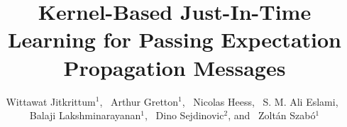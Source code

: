 \documentclass[english]{beamer}
\title{Kernel-Based Just-In-Time Learning for Passing Expectation Propagation
    Messages \vspace{5mm} }
\author{Wittawat Jitkrittum$^1$, \, Arthur Gretton$^1$, \, Nicolas Heess, \, S. M. Ali Eslami, \, 
Balaji Lakshminarayanan$^1$, \, Dino Sejdinovic$^2$, and \, Zolt{\'a}n Szab{\'o}$^1$  
\vspace*{3mm} 
}
\institute{%
Gatsby Computational Neuroscience Unit, University College London$^1$ 
\hspace{2cm}
University of Oxford$^2$
}
\begin{document}
\newcommand{\Simley}[2]{%
\begin{tikzpicture}[scale=0.5]
    \newcommand*{\SmileyRadius}{1.1}%
    \draw [fill=#2] (0,0) circle (\SmileyRadius)%
        ;  
    \pgfmathsetmacro{\eyeX}{0.5*\SmileyRadius*cos(30)}
    \pgfmathsetmacro{\eyeY}{0.5*\SmileyRadius*sin(30)}
    \draw [fill=cyan,draw=none] (\eyeX,\eyeY) circle (0.15cm);
    \draw [fill=cyan,draw=none] (-\eyeX,\eyeY) circle (0.15cm);
    \pgfmathsetmacro{\xScale}{2*\eyeX/180}
    \pgfmathsetmacro{\yScale}{1.0*\eyeY}
    \draw[color=red, domain=-\eyeX:\eyeX]   
        plot ({\x},{
            -0.1+#1*0.15 %
            -#1*1.75*\yScale*(sin((\x+\eyeX)/\xScale))-\eyeY});
\end{tikzpicture}%
}%

\newcommand{\cmark}{\ding{51}}%
\newcommand{\xmark}{\ding{55}}%
\newcommand{\Smile}{ {\large \textcolor{green}{\cmark}} }
\newcommand{\Frown}{ {\large \textcolor{red}{\xmark}} }

\newcommand{\Vskip}{\vspace{5mm}}
\end{document}

